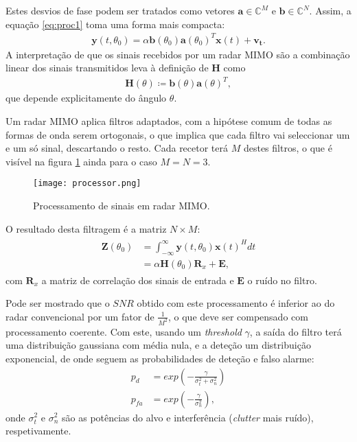 \documentclass[purist,portuguese]{ist-report}
\begin{document}
Estes desvios de fase podem ser tratados como vetores $\mathbf{a} \in \mathbb{C}^M$ e $\mathbf{b} \in \mathbb{C}^N$.
Assim, a equação \ref{eq:proc1} toma uma forma mais compacta:
\begin{align}
  \mathbf{y}(t,\theta_0) = \alpha\mathbf{b}(\theta_0)\mathbf{a}(\theta_0)^T\mathbf{x}(t)+\mathbf{v_t}.
  \label{eq:radc}
\end{align}
A interpretação de que os sinais recebidos por um radar MIMO são a combinação linear dos sinais transmitidos leva à definição de $\mathbf{H}$ como
\begin{align}
  \mathbf{H}(\theta) \coloneqq \mathbf{b}(\theta)\mathbf{a}(\theta)^T,
  \label{eq:H}
\end{align}
que depende explicitamente do ângulo $\theta$.

Um radar MIMO aplica filtros adaptados, com a hipótese comum de todas as formas de onda serem ortogonais, o que implica que cada filtro vai seleccionar um e um só sinal, descartando o resto.
Cada recetor terá $M$ destes filtros, o que é visível na figura \ref{fig:proc} ainda para o caso $M=N=3$.

\begin{figure}[ht]
  \centering
  \texttt{[image: processor.png]}
  \caption{Processamento de sinais em radar MIMO.}
  \label{fig:proc}
\end{figure}

O resultado desta filtragem é a matriz $N\times M$:
\begin{align}
  \begin{aligned}
    \mathbf{Z}(\theta_0) &= \int_{-\infty}^{\infty} \mathbf{y}(t,\theta_0)\mathbf{x}(t)^Hdt \\
	&= \alpha \mathbf{H}(\theta_0)\mathbf{R}_x + \mathbf{E} ,
  \end{aligned}
  \label{eq:Z}
\end{align}
com $\mathbf{R}_x$ a matriz de correlação dos sinais de entrada e $\mathbf{E}$ o ruído no filtro.

Pode ser mostrado que o $SNR$ obtido com este processamento é inferior ao do radar convencional por um fator de $\frac{1}{M^2}$, o que deve ser compensado com processamento coerente.
Com este, usando um \textit{threshold} $\gamma$, a saída do filtro terá uma distribuição gaussiana com média nula, e a deteção um distribuição exponencial, de onde seguem as probabilidades de deteção e falso alarme:
\begin{align}
  p_d &= exp\left( -\frac{\gamma}{\sigma_t^2 + \sigma_n^2} \right) \label{eq:pd} \\
  p_{fa} &= exp\left( -\frac{\gamma}{\sigma_n^2} \right) \label{eq:pfa},
\end{align}
onde $\sigma_t^2$ e $\sigma_n^2$ são as potências do alvo e interferência (\textit{clutter} mais ruído), respetivamente.
\end{document}
